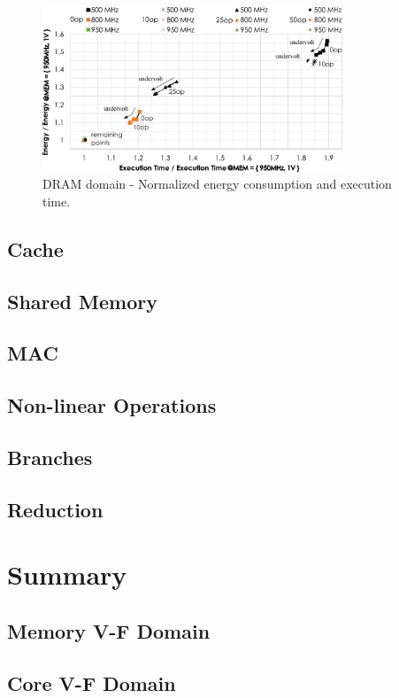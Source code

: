 \begin{figure}[htb]
  \centering
  \includegraphics[width=0.8\textwidth]{Figures/GPU_characterization/DRAM_behaviour.pdf}
  \caption{DRAM domain - Normalized energy consumption and execution time.}
  \label{fig:DRAM_behaviour}
\end{figure}
\subsection{Cache}
\subsection{Shared Memory}
\subsection{MAC}
\subsection{Non-linear Operations}
\subsection{Branches}
\subsection{Reduction}
\section{Summary}


\subsection{Memory V-F Domain}
\label{section:memory}



\subsection{Core V-F Domain}
\label{section:core}